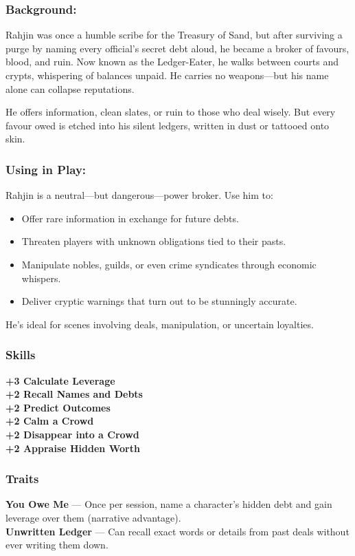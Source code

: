\begin{paracol}{3}
    \subsubsection*{Background:}
    Rahjin was once a humble scribe for the Treasury of Sand, but after surviving a purge by naming every official’s secret debt aloud, he became a broker of favours, blood, and ruin. Now known as the Ledger-Eater, he walks between courts and crypts, whispering of balances unpaid. He carries no weapons—but his name alone can collapse reputations.

    He offers information, clean slates, or ruin to those who deal wisely. But every favour owed is etched into his silent ledgers, written in dust or tattooed onto skin.

    \switchcolumn
    \subsubsection*{Using in Play:}
    Rahjin is a neutral—but dangerous—power broker. Use him to:
    \begin{itemize}\raggedright
        \item Offer rare information in exchange for future debts.
        \item Threaten players with unknown obligations tied to their pasts.
        \item Manipulate nobles, guilds, or even crime syndicates through economic whispers.
        \item Deliver cryptic warnings that turn out to be stunningly accurate.
    \end{itemize}

    He’s ideal for scenes involving deals, manipulation, or uncertain loyalties.

    \switchcolumn
    \subsubsection{Skills}
        \noindent\textbf{+3 Calculate Leverage} \\
        \noindent\textbf{+2 Recall Names and Debts} \\
        \noindent\textbf{+2 Predict Outcomes} \\
        \noindent\textbf{+2 Calm a Crowd} \\
        \noindent\textbf{+2 Disappear into a Crowd} \\
        \noindent\textbf{+2 Appraise Hidden Worth}
    \subsubsection{Traits}
        \textbf{You Owe Me} — Once per session, name a character’s hidden debt and gain leverage over them (narrative advantage).\\
        \textbf{Unwritten Ledger} — Can recall exact words or details from past deals without ever writing them down.
\end{paracol}

